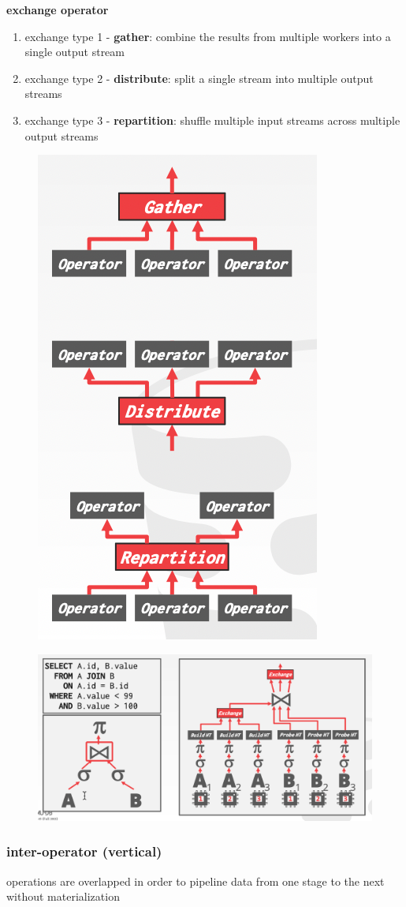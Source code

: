 \documentclass[11pt]{article}
\begin{document}
\textbf{exchange operator}
\begin{enumerate}
\item exchange type 1 - \textbf{gather}: combine the results from multiple workers into a single output stream
\item exchange type 2 - \textbf{distribute}: split a single stream into multiple output streams
\item exchange type 3 - \textbf{repartition}: shuffle multiple input streams across multiple output streams
\end{enumerate}

\begin{figure}[htbp]
\centering
\includegraphics[width=.4\textwidth]{../images/15445/32.png}
\label{}
\end{figure}

\begin{figure}[htbp]
\centering
\includegraphics[width=.7\textwidth]{../images/15445/33.png}
\label{}
\end{figure}
\subsubsection{inter-operator (vertical)}
\label{sec:orge1dff11}
operations are overlapped in order to pipeline data from one stage to the next without
materialization
\end{document}

